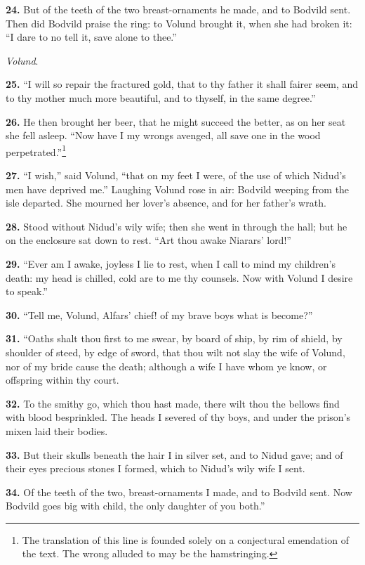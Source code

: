 \textbf{24.} But of the teeth of the two breast-ornaments he made, and to
Bodvild sent. Then did Bodvild praise the ring: to Volund brought it,
when she had broken it: ``I dare to no tell it, save alone to thee.''

\emph{Volund}.

\textbf{25.} ``I will so repair the fractured gold, that to thy father it
shall fairer seem, and to thy mother much more beautiful, and to
thyself, in the same degree.''

\textbf{26.} He then brought her beer, that he might succeed the better, as
on her seat she fell asleep. ``Now have I my wrongs avenged, all save
one in the wood perpetrated.''\footnote{The translation of this line is founded solely on a
conjectural emendation of the text. The wrong alluded to may be the
hamstringing.}

\textbf{27.} ``I wish,'' said Volund, ``that on my feet I were, of the use of
which Nidud's men have deprived me.'' Laughing Volund rose in air:
Bodvild weeping from the isle departed. She mourned her lover's
absence, and for her father's wrath.

\textbf{28.} Stood without Nidud's wily wife; then she went in through the
hall; but he on the enclosure sat down to rest. ``Art thou awake
Niarars' lord!''

\textbf{29.} ``Ever am I awake, joyless I lie to rest, when I call to mind my
children's death: my head is chilled, cold are to me thy counsels.
Now with Volund I desire to speak.''

\textbf{30.} ``Tell me, Volund, Alfars' chief! of my brave boys what is
become?''

\textbf{31.} ``Oaths shalt thou first to me swear, by board of ship, by rim of
shield, by shoulder of steed, by edge of sword, that thou wilt not
slay the wife of Volund, nor of my bride cause the death; although a
wife I have whom ye know, or offspring within thy court.

\textbf{32.} To the smithy go, which thou hast made, there wilt thou the
bellows find with blood besprinkled. The heads I severed of thy boys,
and under the prison's mixen laid their bodies.

\textbf{33.} But their skulls beneath the hair I in silver set, and to Nidud
gave; and of their eyes precious stones I formed, which to Nidud's
wily wife I sent.

\textbf{34.} Of the teeth of the two, breast-ornaments I made, and to Bodvild
sent. Now Bodvild goes big with child, the only daughter of you both.''

